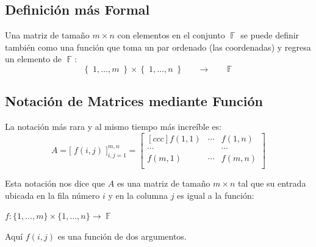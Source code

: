 \documentclass[12pt, fleqn]{report}                             %
\DeclareMathOperator \Space {\quad}                             %
\theoremstyle{break}                                            %
\newcommand \lLongTo {\longrightarrow}                          %
\DeclareMathOperator \GenericField {\mathbb{F}}                 %
\newcommand{\Set}[1]{\left\{ \; #1 \; \right\}}                 %
\newcommand{\BigBrackets}[1]{\Big[ \; #1 \; \Big]}              %
\begin{document}
            \subsection*{Definición más Formal}
                Una matriz de tamaño $m \times n$ con elementos en el conjunto $\GenericField$ se puede
                definir también como una función que toma un par ordenado (las coordenadas) y regresa
                un elemento de $\GenericField$: 
                \begin{equation*}
                    \Set{1, \dots, m} \times \Set{1, \dots , n}
                        \Space \lLongTo \Space
                    \GenericField
                \end{equation*}


            \clearpage
            \subsection{Notación de Matrices mediante Función}

                La notación más rara y al mismo tiempo más increíble es:
                \begin{equation*}
                    A   
                        = \BigBrackets{ f(i,j) }_{i, j = 1}^{m, n}
                        =
                        \begin{bmatrix}[ccc]
                            f(1,1)  & \cdots & f(1,n)   \\
                            \cdots  &        & \cdots   \\
                            f(m, 1) & \cdots & f(m,n)   \\
                        \end{bmatrix}
                \end{equation*}

                Esta notación nos dice que $A$ es una matriz de tamaño $m \times n$ tal
                que su entrada ubicada en la fila número $i$ y en la columna $j$ es igual
                a la función: 

                $f: \{1, \dots, m\} \times \{1, \dots, n\} \to \GenericField$
                
                Aquí $f(i, j)$ es una función de dos argumentos.


        \vspace{1em}
\end{document}
